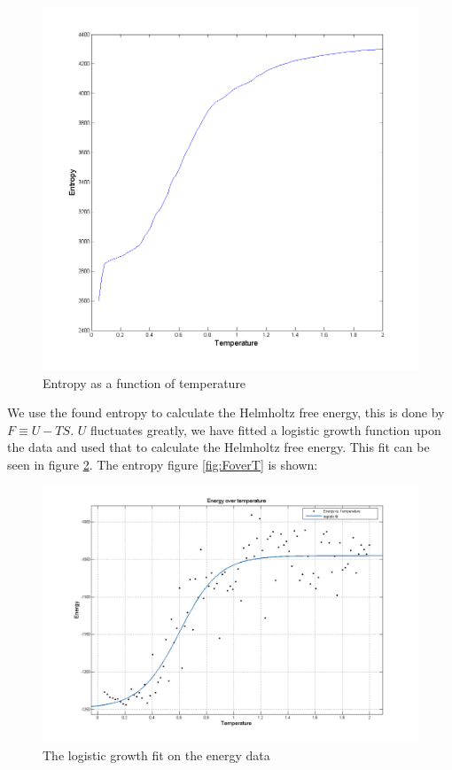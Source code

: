 \documentclass[12pt,a4paper]{report}
\begin{document}
\begin{figure}[h]
\centering
\includegraphics[width=\textwidth]{SoverT.png}
\caption{Entropy as a function of temperature}
\label{fig:SoverT}
\end{figure}
We use the found entropy to calculate the Helmholtz free energy, this is done by $F \equiv U-TS$. $U$ fluctuates greatly, we have fitted a logistic growth function upon the data and used that to calculate the Helmholtz free energy. This fit can be seen in figure \ref{fit}.  The entropy figure \ref{fig:FoverT} is shown:

\begin{figure}[h]
\centering
\includegraphics[width=\textwidth]{fit.png}
\caption{The logistic growth fit on the energy data}
\label{fit}
\end{figure}
\end{document}
